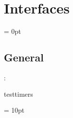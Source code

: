 
\section{Interfaces} 


\parskip = 0pt

\vspace{3mm} \subsection*{General}

: 

testtimers
\vspace{2mm}

\vspace{5mm}\parskip = 10pt 
